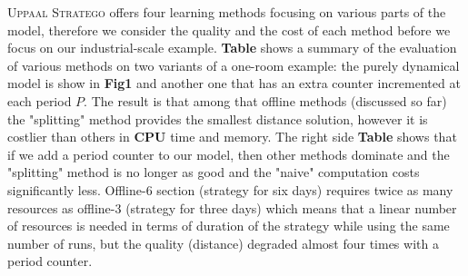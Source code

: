     \textsc{Uppaal Stratego} offers four learning methods focusing on various parts of the model,
    therefore we consider the quality and the cost of each method before we focus on our 
    industrial-scale example. \textbf{Table} shows a summary of the evaluation of various 
    methods on two variants of a one-room example: the purely dynamical model is show in \textbf{Fig1}
    and another one that has an extra counter incremented at each period $P$. The result
    is that among that offline methods (discussed so far) the "splitting" method provides 
    the smallest distance solution, however it is costlier than others in \textbf{CPU} time
    and memory. The right side \textbf{Table} shows that if we add a period counter to our
    model, then other methods dominate and the "splitting" method is no longer as good and 
    the "naive" computation costs significantly less. Offline-6 section (strategy for six days)
    requires twice as many resources as offline-3 (strategy for three days) which means 
    that a linear number of resources is needed in terms of duration of the strategy while 
    using the same number of runs, but the quality (distance) degraded almost four times
    with a period counter.

    \clearpage

